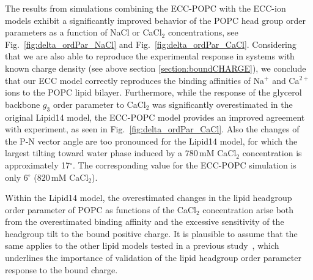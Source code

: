 The results from simulations combining the ECC-POPC with the ECC-ion models \citep{martinek17, kohagen16, Pluharova2014} exhibit a significantly improved behavior of the POPC head group order parameters as a function of NaCl or CaCl$_2$ concentrations, see Fig.~\ref{fig:delta_ordPar_NaCl} and Fig.~\ref{fig:delta_ordPar_CaCl}. Considering that we are also able to reproduce the experimental response in systems with known charge density (see above section \ref{section:boundCHARGE}), we conclude that our ECC model correctly reproduces the binding affinities of Na$^{+}$ and Ca$^{2+}$ ions to the POPC lipid bilayer. Furthermore, while the response of the glycerol backbone $g_3$ order parameter to CaCl$_2$ was significantly overestimated in the original Lipid14 model, the ECC-POPC model provides an improved agreement with experiment, as seen in Fig.~\ref{fig:delta_ordPar_CaCl}. 
Also the changes of the P-N vector angle are too pronounced for the Lipid14 model, 
for which the largest tilting toward water phase induced by a $780\,\mathrm{mM}$ 
CaCl$_2$ concentration is approximately 17$^{\circ}$. The corresponding value 
for the ECC-POPC simulation is only 6$^{\circ}$ ($820\,\mathrm{mM}$ CaCl$_2$).  

Within the Lipid14 model, the overestimated changes in the lipid headgroup order parameter of POPC  as functions of the CaCl$_2$ concentration arise both from the overestimated binding affinity and the excessive sensitivity of the headgroup tilt to the bound positive charge. It is plausible to assume that the same applies to the other lipid models tested in a previous study~\citep{catte16}, which underlines the importance of validation of the lipid headgroup order parameter response to the bound charge.  


